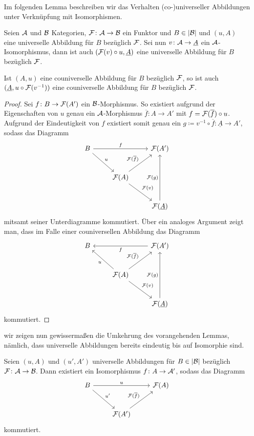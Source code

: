 Im folgenden Lemma beschreiben wir das Verhalten (co-)universeller Abbildungen unter Verknüpfung mit Isomorphismen.

\begin{lem}
  \label{lem:universalCircIso}
  Seien $\mathcal{A}$ und $\mathcal{B}$ Kategorien, $\mathcal{F} \colon \mathcal{A} \to \mathcal{B}$ ein Funktor und $B \in |\mathcal{B}|$ und $(u,A)$ eine universelle Abbildung für $B$ bezüglich $\mathcal{F}$.
  Sei nun $v \colon \mathcal{A} \to \underline A$ ein $\mathcal{A}$-Isomorphismus, dann ist auch $(\mathcal{F}(v) \circ u, \underline A )$ eine universelle Abbildung für $B$ bezüglich $\mathcal{F}$.

  Ist $(A, u)$ eine couniverselle Abbildung für $B$ bezüglich $\mathcal{F}$, so ist auch $(\underline A, u \circ \mathcal{F}(v^{-1}))$ eine couniverselle Abbildung für $B$ bezüglich $\mathcal{F}$.
\end{lem}

\begin{proof}
  Sei $f \colon B \to \mathcal{F}(A')$ ein $\mathcal{B}$-Morphismus. 
  So existiert aufgrund der Eigenschaften von $u$ genau ein $\mathcal{A}$-Morphismus $\overline f \colon A \to A'$ mit $f = \mathcal{F}(\overline f) \circ u$.
  Aufgrund der Eindeutigkeit von $f$ existiert somit genau ein $g \coloneqq v^{-1} \circ \overline f \colon \underline A \to A'$, sodass das Diagramm   
  $$
  \begin{tikzcd}[row sep=2.5em]
    B \arrow[rd,"u"] \arrow[rr, "f"] &&\F(A') \\
    &\F(A) \arrow[ru, "\F(\overline{f})"] \arrow[rd,"\F(v)"] \\
    &&\F(\underline A) \arrow[uu,"\F(g)"]
  \end{tikzcd}
  $$
  mitsamt seiner Unterdiagramme kommutiert.
  Über ein analoges Argument zeigt man, dass im Falle einer couniversellen Abbildung das Diagramm
  $$
  \begin{tikzcd}[row sep=2.5em]
    B  & & \F(A') \arrow[ll, "f"]  \\
    & \F(A)\arrow[ru, "\F(\overline{f})"] \arrow[lu,"u"] \arrow[rd, "\F(v)"]  & \\
    & & \F(\underline A) \arrow[uu, "\F(g)"]
  \end{tikzcd}
  $$
  kommutiert.
\end{proof}

wir zeigen nun gewissermaßen die Umkehrung des vorangehenden Lemmas, nämlich, dass universelle Abbildungen bereits eindeutig bis auf Isomorphie sind.

\begin{prop}
  Seien $(u,A)$ und $(u',A')$ universelle Abbildungen für $B \in |\mathcal{B}|$ bezüglich $\mathcal{F} \colon \mathcal{A} \to \mathcal{B}$.
  Dann existiert ein Isomorphismus $f \colon A \to \mathcal{A}'$, sodass das Diagramm
  $$
  \begin{tikzcd}[row sep=2.5em]
    B \arrow[rd,"u'"] \arrow[rr, "u"] &&\F(A) \\
    &\F(A') \arrow[ru, "\F(\overline{f})"]
  \end{tikzcd}
  $$
  kommutiert.
\end{prop}

